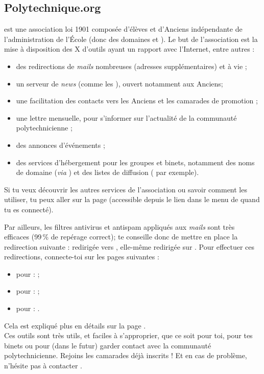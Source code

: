 \subsection{Polytechnique.org}
 est une association loi 1901 composée d'élèves et d'Anciens
 indépendante de l'administration de l'\'Ecole (donc des domaines 
 et ). Le but de l'association est la mise à disposition des X d'outils
ayant un rapport avec l'Internet, entre autres :
\begin{itemize}
  \item des redirections de \emph{mails} nombreuses (adresses supplémentaires) et à vie ;
  \item un serveur de \emph{news} (comme les ), ouvert notamment aux Anciens;
  \item une facilitation des contacts vers les Anciens et les camarades de promotion ;
  \item une lettre mensuelle, pour s'informer sur l'actualité de la communauté polytechnicienne ;
  \item des annonces d'événements ;
  \item des services d'hébergement pour les groupes et binets, notamment des noms de domaine (\emph{via} ) et des listes de diffusion ( par exemple).
\end{itemize}
Si tu veux découvrir les autres services de l'association ou savoir
comment les utiliser, tu peux aller sur la page
 (accessible depuis
le lien  dans le menu de 
quand tu es connecté).

Par ailleurs, les filtres antivirus et antispam appliqués aux \emph{mails} sont très efficaces (99\,\% de repérage correct);  te conseille donc de mettre en place la redirection suivante :
redirigée vers ,
elle-même redirigée sur .
Pour effectuer ces redirections, connecte-toi sur les pages suivantes :
\begin{itemize}
  \item pour  :  ;
  \item pour  :  ;
  \item pour  : .
\end{itemize}
Cela est expliqué plus en détails sur la page
. \\
%
\nopagebreak
%
\indent Ces outils sont très utils, et faciles à s'approprier, que
ce soit pour toi, pour tes binets ou pour (dans le
futur) garder contact avec la communauté polytechnicienne. Rejoins
les  camarades déjà inscrits ! Et en cas de problème, n'hésite pas à contacter
.
